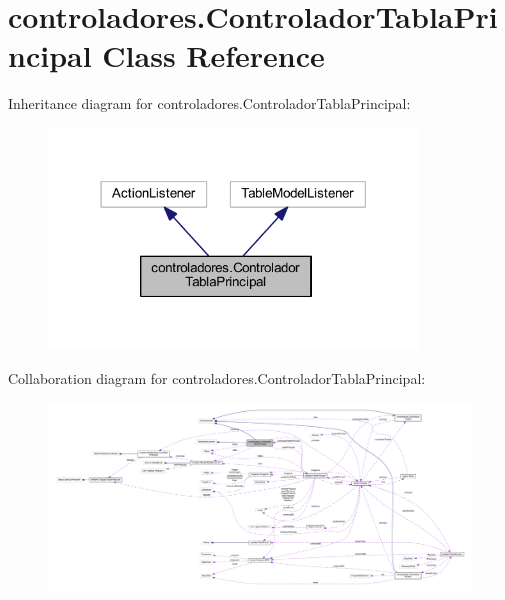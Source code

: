 \hypertarget{classcontroladores_1_1_controlador_tabla_principal}{}\section{controladores.\+Controlador\+Tabla\+Principal Class Reference}
\label{classcontroladores_1_1_controlador_tabla_principal}


Inheritance diagram for controladores.\+Controlador\+Tabla\+Principal\+:
\nopagebreak
\begin{figure}[H]
\begin{center}
\leavevmode
\includegraphics[width=278pt]{classcontroladores_1_1_controlador_tabla_principal__inherit__graph}
\end{center}
\end{figure}


Collaboration diagram for controladores.\+Controlador\+Tabla\+Principal\+:
\nopagebreak
\begin{figure}[H]
\begin{center}
\leavevmode
\includegraphics[width=350pt]{classcontroladores_1_1_controlador_tabla_principal__coll__graph}
\end{center}
\end{figure}
